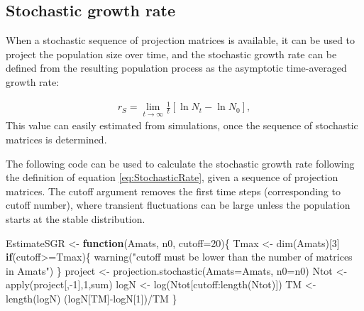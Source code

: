 \documentclass[
]{book}
\newenvironment{Shaded}{\begin{snugshade}}{\end{snugshade}}
\newcommand{\AttributeTok}[1]{\textcolor[rgb]{0.77,0.63,0.00}{#1}}
\newcommand{\ControlFlowTok}[1]{\textcolor[rgb]{0.13,0.29,0.53}{\textbf{#1}}}
\newcommand{\DecValTok}[1]{\textcolor[rgb]{0.00,0.00,0.81}{#1}}
\newcommand{\FunctionTok}[1]{\textcolor[rgb]{0.00,0.00,0.00}{#1}}
\newcommand{\NormalTok}[1]{#1}
\newcommand{\OtherTok}[1]{\textcolor[rgb]{0.56,0.35,0.01}{#1}}
\newcommand{\SpecialCharTok}[1]{\textcolor[rgb]{0.00,0.00,0.00}{#1}}
\newcommand{\StringTok}[1]{\textcolor[rgb]{0.31,0.60,0.02}{#1}}
\begin{document}
\hypertarget{stochastic-growth-rate}{%
\subsection{Stochastic growth rate}\label{stochastic-growth-rate}}

When a stochastic sequence of projection matrices is available, it can be used to project the population size over time, and the stochastic growth rate can be defined from the resulting population process as the asymptotic time-averaged growth rate:

\begin{align}
r_S=\lim_{t\to\infty}\frac{1}{t}[\ln N_t-\ln N_0],
\label{eq:StochasticRate}
\end{align}
This value can easily estimated from simulations, once the sequence of stochastic matrices is determined.

The following code can be used to calculate the stochastic growth rate following the definition of equation \eqref{eq:StochasticRate}, given a sequence of projection matrices. The cutoff argument removes the first time steps (corresponding to cutoff number), where transient fluctuations can be large unless the population starts at the stable distribution.

\begin{Shaded}
\begin{Highlighting}[]
\NormalTok{EstimateSGR }\OtherTok{\textless{}{-}} \ControlFlowTok{function}\NormalTok{(Amats, n0, }\AttributeTok{cutoff=}\DecValTok{20}\NormalTok{)\{}
\NormalTok{  Tmax }\OtherTok{\textless{}{-}} \FunctionTok{dim}\NormalTok{(Amats)[}\DecValTok{3}\NormalTok{]}
    \ControlFlowTok{if}\NormalTok{(cutoff}\SpecialCharTok{\textgreater{}=}\NormalTok{Tmax)\{}
      \FunctionTok{warning}\NormalTok{(}\StringTok{"cutoff must be lower }
\StringTok{              than the number of }
\StringTok{              matrices in Amats"}\NormalTok{)}
\NormalTok{      \}}
\NormalTok{  project }\OtherTok{\textless{}{-}} \FunctionTok{projection.stochastic}\NormalTok{(}\AttributeTok{Amats=}\NormalTok{Amats, }\AttributeTok{n0=}\NormalTok{n0) }
\NormalTok{  Ntot }\OtherTok{\textless{}{-}} \FunctionTok{apply}\NormalTok{(project[,}\SpecialCharTok{{-}}\DecValTok{1}\NormalTok{],}\DecValTok{1}\NormalTok{,sum)}
\NormalTok{  logN }\OtherTok{\textless{}{-}} \FunctionTok{log}\NormalTok{(Ntot[cutoff}\SpecialCharTok{:}\FunctionTok{length}\NormalTok{(Ntot)])}
\NormalTok{  TM }\OtherTok{\textless{}{-}} \FunctionTok{length}\NormalTok{(logN)}
\NormalTok{  (logN[TM]}\SpecialCharTok{{-}}\NormalTok{logN[}\DecValTok{1}\NormalTok{])}\SpecialCharTok{/}\NormalTok{TM}
\NormalTok{\}}
\end{Highlighting}
\end{Shaded}
\end{document}
